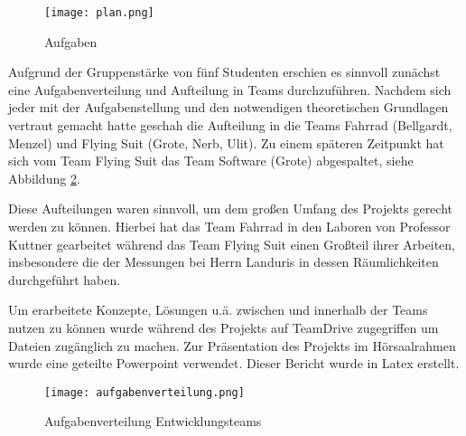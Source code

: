\begin{figure}[h]
    \begin{center}
        \texttt{[image: plan.png]}
        \caption[Aufgaben (Abbildungsverzeichnis)]{Aufgaben
        }
        \label{fig:plan}
    \end{center}
\end{figure}


Aufgrund der Gruppenstärke von fünf Studenten erschien es sinnvoll zunächst eine Aufgabenverteilung und Aufteilung in Teams durchzuführen.
Nachdem sich jeder mit der Aufgabenstellung und den notwendigen theoretischen Grundlagen vertraut gemacht hatte geschah die Aufteilung in die Teams Fahrrad (Bellgardt, Menzel) und Flying Suit (Grote, Nerb, Ulit).
Zu einem späteren Zeitpunkt hat sich vom Team Flying Suit das Team Software (Grote) abgespaltet, siehe Abbildung \ref{fig:aufgabenverteilung}.

Diese Aufteilungen waren sinnvoll, um dem großen Umfang des Projekts gerecht werden zu können. Hierbei hat das Team Fahrrad in den Laboren von Professor Kuttner gearbeitet während das Team Flying Suit einen Großteil ihrer Arbeiten, insbesondere die der Messungen bei Herrn Landuris in dessen Räumlichkeiten durchgeführt haben.

Um erarbeitete Konzepte, Lösungen u.ä. zwischen und innerhalb der Teams nutzen zu können wurde während des Projekts auf TeamDrive zugegriffen um Dateien zugänglich zu machen.
Zur Präsentation des Projekts im Hörsaalrahmen wurde eine geteilte Powerpoint verwendet. Dieser Bericht wurde in Latex erstellt.

\begin{figure}[h]
    \begin{center}
        \texttt{[image: aufgabenverteilung.png]}
        \caption[Aufgabenverteilung Entwicklungsteams (Abbildungsverzeichnis)]{Aufgabenverteilung Entwicklungsteams
        }
        \label{fig:aufgabenverteilung}
    \end{center}
\end{figure}